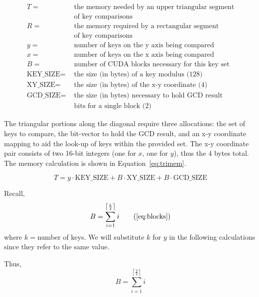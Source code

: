 \documentclass[smallextended]{svjour3}       %
\begin{document}
\begin{displaymath}
   \begin{split}
   T = & \mbox{ the memory needed by an upper triangular segment}\\
       & \mbox{ of key comparisons}\\
   R = & \mbox{ the memory required by a rectangular segment}\\
       & \mbox{ of key comparisons}\\
   y = & \mbox{ number of keys on the y axis being compared}\\
   x = & \mbox{ number of keys on the x axis being compared}\\
   B = & \mbox{ number of CUDA blocks necessary for this key set}\\
   \textrm{KEY\_SIZE} = & \mbox{ the size (in bytes) of a key modulus (128)}\\
   \textrm{XY\_SIZE} = & \mbox{ the size (in bytes) of the x-y coordinate (4)}\\
   \textrm{GCD\_SIZE} = & \mbox{ the size (in bytes) necessary to hold GCD result}\\
               & \mbox{ bits for a single block (2)}
   \end{split}
\end{displaymath}

The triangular portions along the diagonal require three allocations: the set of
keys to compare, the bit-vector to hold the GCD result, and an x-y coordinate
mapping to aid the look-up of keys within the provided set. The x-y coordinate
pair consists of two 16-bit integers (one for $x$, one for $y$), thus the 4
bytes total. The memory calculation is shown in Equation~\ref{eq:trimem}.  

\begin{equation}
   T = y \cdot \textrm{KEY\_SIZE} + B \cdot \textrm{XY\_SIZE} + B \cdot \textrm{GCD\_SIZE}
   \label{eq:trimem}
\end{equation}

\noindent Recall,
\begin{equation}
   B = \sum_{i=1}^{\left\lceil \frac{k}{4} \right\rceil}i
   \tag{\ref{eq:blocks}}
\end{equation}
where $k = $number of keys. We will substitute $k$ for $y$ in the following
calculations since they refer to the same value.  

\noindent Thus,
\begin{equation}
   B = \sum_{i=1}^{\left\lceil \frac{y}{4} \right\rceil}i
   \label{eq:blocksy}
\end{equation}
\end{document}
